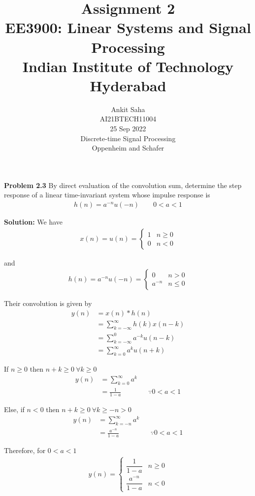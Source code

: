 \documentclass[journal,12pt,twocolumn]{IEEEtran}
\title{Assignment 2 \\ \Large EE3900: Linear Systems and Signal Processing \\ \large Indian Institute of Technology Hyderabad}
\author{Ankit Saha \\ \normalsize AI21BTECH11004 \\ \vspace*{20pt} \normalsize 25 Sep 2022 \\ \vspace*{20pt} \Large Discrete-time Signal Processing \\ \large Oppenheim and Schafer}
\newcommand{\solution}{\noindent \textbf{Solution: }}
\begin{document}
	\maketitle
	
	\textbf{Problem 2.3} By direct evaluation of the convolution sum, determine the step response of a linear time-invariant system whose impulse response is
	\begin{align}
		h(n) = a^{-n} u(-n) \qquad 0 < a < 1
	\end{align}
	
	\solution 
	We have
	\begin{align}
		x(n) = u(n) = 
		\begin{cases}
			1 & n \ge 0 \\
			0 & n < 0
		\end{cases}
	\end{align}
	
	and
	\begin{align}
		h(n) = a^{-n}u(-n) = 
		\begin{cases}
			0 & n > 0 \\
			a^{-n} & n \le 0
		\end{cases}
	\end{align}
	
	Their convolution is given by
	\begin{align}
		y(n) &= x(n) * h(n) \\
		&= \sum_{k=-\infty}^\infty h(k) x(n-k) \\
		&= \sum_{k=-\infty}^0 a^{-k} u(n-k) \\
		&= \sum_{k=0}^\infty a^k u(n+k)
	\end{align}
	
	If $n \ge 0$ then $n + k \ge 0 ~\forall k \ge 0$
	\begin{align}
		y(n) &= \sum_{k=0}^\infty a^k \\
		&= \frac{1}{1-a} &&\because 0<a<1
	\end{align}
	
	Else, if $n < 0$ then $n + k \ge 0 ~\forall k \ge -n > 0$
	\begin{align}
		y(n) &= \sum_{k=-n}^\infty a^k \\
		&= \frac{a^{-n}}{1-a} &&\because 0<a<1
	\end{align}
	
	Therefore, for $0 < a < 1$
	\begin{align}
		y(n) = 
		\begin{cases}
			\dfrac{1}{1-a} & n \ge 0 \\
			\dfrac{a^{-n}}{1-a} & n < 0
		\end{cases}
	\end{align}
	
\end{document}
